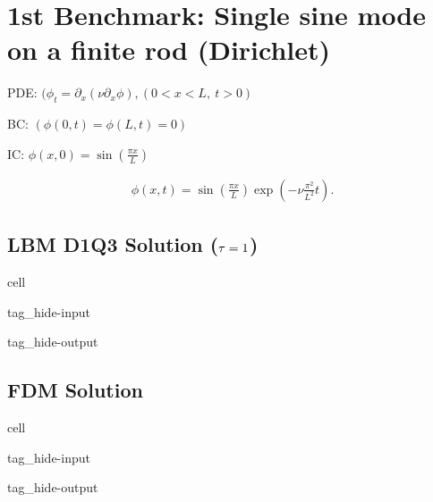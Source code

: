 \documentclass[letterpaper,10pt,english,openany,oneside]{jupyterBook}
\begin{document}
\section{1st Benchmark: Single sine mode on a finite rod (Dirichlet)}
\label{\detokenize{LBM-Study/Diffusive-Equation:st-benchmark-single-sine-mode-on-a-finite-rod-dirichlet}}
\sphinxAtStartPar
PDE: \((\phi_t = \partial_{x}(\nu\partial_{x}\phi), (0<x<L,\ t>0)\)

\sphinxAtStartPar
BC: \((\phi(0,t)=\phi(L,t)=0)\)

\sphinxAtStartPar
IC: \(\phi(x,0)=\sin \left(\frac{\pi x}{L}\right)\)

\sphinxAtStartPar
{}
\begin{equation*}
\begin{split}
\phi(x,t)=\sin\left(\frac{\pi x}{L}\right) \exp \left(-\nu \frac{\pi^2}{L^2} t\right).
\end{split}
\end{equation*}

\subsection{LBM D1Q3 Solution (\protect\(\tau=1\protect\))}
\label{\detokenize{LBM-Study/Diffusive-Equation:lbm-d1q3-solution-tau-1}}
\begin{sphinxuseclass}{cell}
\begin{sphinxuseclass}{tag_hide-input}
\begin{sphinxuseclass}{tag_hide-output}
\end{sphinxuseclass}
\end{sphinxuseclass}
\end{sphinxuseclass}

\subsection{FDM Solution}
\label{\detokenize{LBM-Study/Diffusive-Equation:fdm-solution}}
\begin{sphinxuseclass}{cell}
\begin{sphinxuseclass}{tag_hide-input}
\begin{sphinxuseclass}{tag_hide-output}
\end{sphinxuseclass}
\end{sphinxuseclass}
\end{sphinxuseclass}
\end{document}
